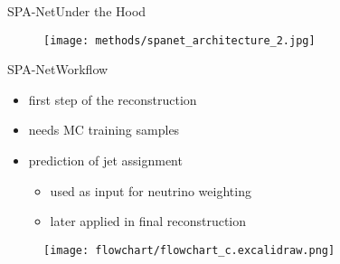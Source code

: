 \documentclass[9pt, aspectratio=169]{beamer}
\begin{document}
\begin{frame}{SPA-Net}{Under the Hood}
  
	\begin{figure}
		\centering
		\texttt{[image: methods/spanet\_architecture\_2.jpg]}
		
	\end{figure}
\end{frame}

\begin{frame}{SPA-Net}{Workflow}
	\begin{minipage}{.58\textwidth}
		\begin{itemize}
			\item first step of the reconstruction
			\item needs MC training samples
			\item \spanets prediction of jet assignment
			\begin{itemize}
				\item used as input for neutrino weighting
				\item later applied in final reconstruction
			\end{itemize}
		\end{itemize}
	  \end{minipage}\hfill
	  \begin{minipage}{.2\textwidth}
		  \begin{figure}
			  \centering
			  \texttt{[image: flowchart/flowchart\_c.excalidraw.png]}	
		  \end{figure}
	  \end{minipage}
\end{frame}
\end{document}
